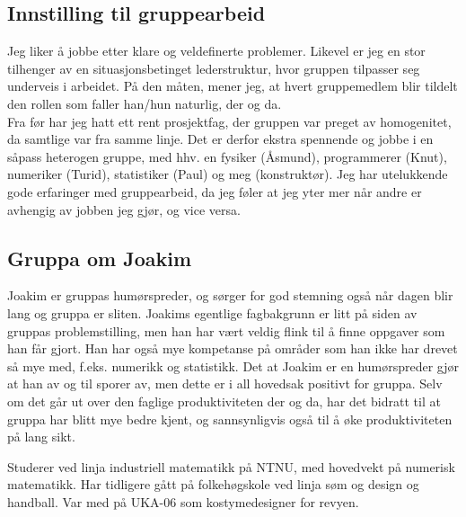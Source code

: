 \subsection*{Innstilling til gruppearbeid}

Jeg liker å jobbe etter klare og veldefinerte problemer. Likevel
er jeg en stor tilhenger av en situasjonsbetinget lederstruktur, hvor gruppen
tilpasser seg underveis i arbeidet. På den måten, mener jeg, at hvert
gruppemedlem blir tildelt den rollen som faller han/hun naturlig, der og da.\\ 

Fra før har jeg hatt ett rent prosjektfag, der  gruppen var preget av
homogenitet, da samtlige var fra samme linje. Det er derfor ekstra spennende og
jobbe i en såpass heterogen gruppe, med hhv. en fysiker (Åsmund), programmerer
(Knut), numeriker (Turid), statistiker (Paul) og meg (konstruktør). Jeg har
utelukkende gode erfaringer med gruppearbeid, da jeg føler at jeg yter mer når
andre er avhengig av jobben jeg gjør, og vice versa.


\subsection*{Gruppa om Joakim}
Joakim er gruppas humørspreder, og sørger for god stemning også når dagen blir
lang og gruppa er sliten. Joakims egentlige fagbakgrunn er litt på siden av
gruppas problemstilling, men han har vært veldig flink til å finne oppgaver som
han får gjort. Han har også mye kompetanse på områder som han ikke har drevet så
mye med, f.eks. numerikk og statistikk. Det at Joakim er en humørspreder gjør at 
han av og til sporer av, men dette er i all hovedsak positivt for gruppa. Selv om 
det går ut over den faglige produktiviteten der og da, har det bidratt til at 
gruppa har blitt mye bedre kjent, og sannsynligvis også til å øke produktiviteten 
på lang sikt.

Studerer ved linja industriell matematikk på NTNU, med hovedvekt på numerisk matematikk. Har tidligere gått på folkehøgskole ved linja søm og design og handball. Var med på UKA-06 som kostymedesigner for revyen.

